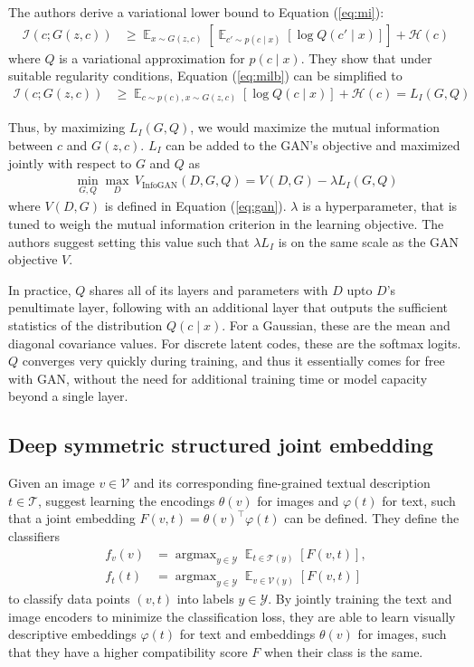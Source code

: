 \documentclass{article}
\DeclareMathOperator*{\argmax}{\arg\max}
\DeclareMathOperator*{\E}{\mathbb{E}}
\let\cite=\supercite
\begin{document}
The authors derive a variational lower bound to Equation (\ref{eq:mi}):
\begin{align}
\mathcal{I}(c;G(z,c)) &\geq \E_{x\sim G(z,c)}\left[\E_{c'\sim p(c\mid x)}\left[\log Q(c'\mid x)\right]\right] + \mathcal{H}(c) \label{eq:milb}
\end{align}
where $Q$ is a variational approximation for $p(c\mid x)$. They show that under suitable regularity conditions, Equation (\ref{eq:milb}) can be simplified to
\begin{align}
\mathcal{I}(c;G(z,c)) &\geq \E_{c\sim p(c), x\sim G(z,c)}\left[\log Q(c\mid x)\right] + \mathcal{H}(c) = L_I(G,Q) \label{eq:miloss}
\end{align}

Thus, by maximizing $L_I(G,Q)$, we would maximize the mutual information between $c$ and $G(z,c)$. $L_I$ can be added to the GAN's objective and maximized jointly with respect to $G$ and $Q$ as
\begin{align}
\min_{G,Q} \max_D\, V_{\text{InfoGAN}}(D,G,Q) = V(D,G) - \lambda L_I(G,Q)
\end{align}
where $V(D,G)$ is defined in Equation (\ref{eq:gan}). $\lambda$ is a hyperparameter, that is tuned to weigh the mutual information criterion in the learning objective. The authors suggest setting this value such that $\lambda L_I$ is on the same scale as the GAN objective $V$.

In practice, $Q$ shares all of its layers and parameters with $D$ upto $D$'s penultimate layer, following with an additional layer that outputs the sufficient statistics of the distribution $Q(c\mid x)$. For a Gaussian, these are the mean and diagonal covariance values. For discrete latent codes, these are the softmax logits. $Q$ converges very quickly during training, and thus it essentially comes for free with GAN, without the need for additional training time or model capacity beyond a single layer.


\subsection{Deep symmetric structured joint embedding}

Given an image $v\in\mathcal{V}$ and its corresponding fine-grained textual description $t\in\mathcal{T}$, \cite{visualdesc} suggest learning the encodings $\theta(v)$ for images and $\varphi(t)$ for text, such that a joint embedding $F(v,t)=\theta(v)^\top \varphi(t)$ can be defined. They define the classifiers
\begin{align}
f_v(v) &= \argmax_{y\in\mathcal{Y}} \E_{t\in\mathcal{T}(y)}\left[F(v,t)\right],\\
f_t(t) &= \argmax_{y\in\mathcal{Y}} \E_{v\in\mathcal{V}(y)}\left[F(v,t)\right]
\end{align}
to classify data points $(v,t)$ into labels $y\in\mathcal{Y}$. By jointly training the text and image encoders to minimize the classification loss, they are able to learn visually descriptive embeddings $\varphi(t)$ for text and embeddings $\theta(v)$ for images, such that they have a higher compatibility score $F$ when their class is the same.
\end{document}
